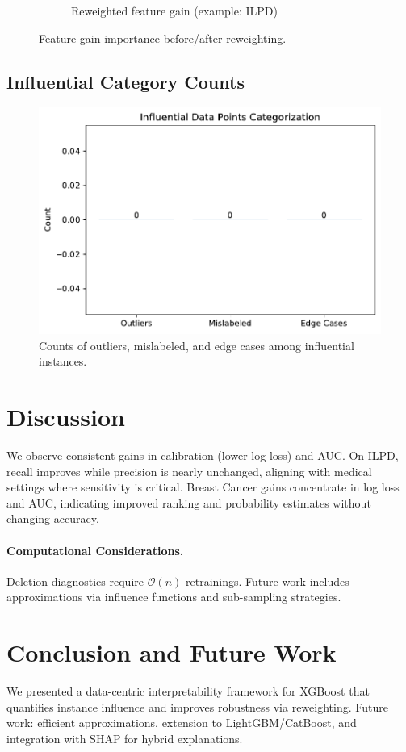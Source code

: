 \documentclass[sn-basic]{sn-jnl} %
\begin{document}
\begin{figure}[H]
\begin{subfigure}{.49\linewidth}
    \caption{Reweighted feature gain (example: ILPD)}
  \end{subfigure}
  \caption{Feature gain importance before/after reweighting.}
  \label{fig:featgain}
\end{figure}

\subsection{Influential Category Counts}
\begin{figure}[H]
  \centering
  \includegraphics[width=.7\linewidth]{fig_category_counts.pdf}%
  \caption{Counts of outliers, mislabeled, and edge cases among influential instances.}
  \label{fig:cats}
\end{figure}

\section{Discussion}
We observe consistent gains in calibration (lower log loss) and AUC. On ILPD, recall improves while precision is nearly unchanged, aligning with medical settings where sensitivity is critical. Breast Cancer gains concentrate in log loss and AUC, indicating improved ranking and probability estimates without changing accuracy.

\paragraph{Computational Considerations.} Deletion diagnostics require $\mathcal{O}(n)$ retrainings. Future work includes approximations via influence functions and sub-sampling strategies.

\section{Conclusion and Future Work}
We presented a data-centric interpretability framework for XGBoost that quantifies instance influence and improves robustness via reweighting. Future work: efficient approximations, extension to LightGBM/CatBoost, and integration with SHAP for hybrid explanations.
\end{document}
